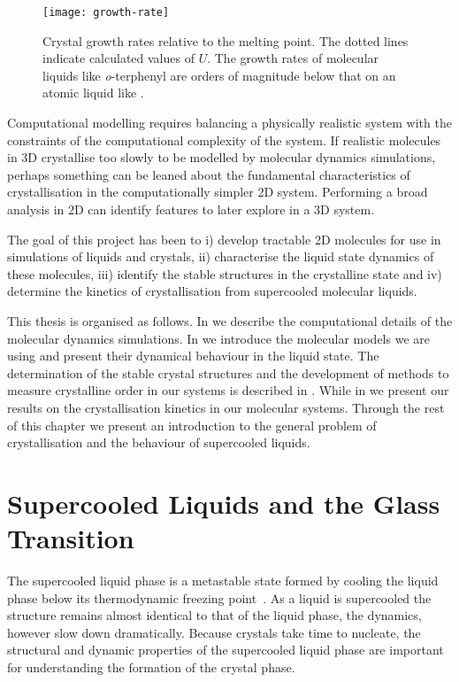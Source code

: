 \begin{figure}
    \centering
    \texttt{[image: growth-rate]}
    \caption{Crystal growth rates relative to the melting point. The dotted lines indicate calculated values of $U$. The growth rates of molecular liquids like {\em o}-terphenyl are orders of magnitude below that on an atomic liquid like .}
    \label{fig:growth rate}
\end{figure}

Computational modelling requires balancing a physically realistic system with the constraints of the computational complexity of the system. If realistic molecules in 3D crystallise too slowly to be modelled by molecular dynamics simulations, perhaps something can be leaned about the fundamental characteristics of crystallisation in the computationally simpler 2D system. Performing a broad analysis in 2D can identify features to later explore in a 3D system.

The goal of this project has been to i) develop tractable 2D molecules for use in simulations of liquids and crystals, ii) characterise the liquid state dynamics of these molecules, iii) identify the stable structures in the crystalline state and iv) determine the kinetics of crystallisation from supercooled molecular liquids.

This thesis is organised as follows. In  we describe the computational details of the molecular dynamics simulations. In  we introduce the molecular models we are using and present their dynamical behaviour in the liquid state. The determination of the stable crystal structures and the development of methods to measure crystalline order in our systems is described in . While in  we present our results on the crystallisation kinetics in our molecular systems. Through the rest of this chapter we present an introduction to the general problem of crystallisation and the behaviour of supercooled liquids.

\section{Supercooled Liquids and the Glass Transition}

The supercooled liquid phase is a metastable state formed by cooling the liquid phase below its thermodynamic freezing point~\cite{cavagna:09}. As a liquid is supercooled the structure remains almost identical to that of the liquid phase, the dynamics, however slow down dramatically. Because crystals take time to nucleate, the structural and dynamic properties of the supercooled liquid phase are important for understanding the formation of the crystal phase.

